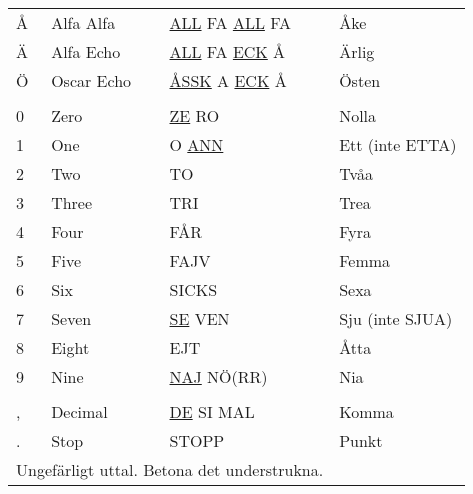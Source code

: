 \begin{table}[htbp]
\begin{tabular}{llll}
    Å & Alfa Alfa & \underline{ALL} FA \underline{ALL} FA & Åke \\
    Ä & Alfa Echo & \underline{ALL} FA \underline{ECK} Å & Ärlig \\
    Ö & Oscar Echo & \underline{ÅSSK} A \underline{ECK} Å & Östen \\
    & & \\
    0 & Zero & \underline{ZE} RO & Nolla \\
    1 & One & O \underline{ANN} & Ett (inte ETTA)\\
    2 & Two & TO & Tvåa \\
    3 & Three & TRI & Trea \\
    4 & Four & FÅR & Fyra \\
    5 & Five & FAJV & Femma \\
    6 & Six & SICKS & Sexa \\
    7 & Seven & \underline{SE} VEN & Sju (inte SJUA)\\
    8 & Eight & EJT & Åtta \\
    9 & Nine & \underline{NAJ} NÖ(RR) & Nia \\
    & & \\
    , & Decimal & \underline{DE} SI MAL & Komma \\
    . & Stop & STOPP & Punkt \\
    \multicolumn{3}{l}{Ungefärligt uttal. Betona det understrukna.}
  \end{tabular}
\end{table}

